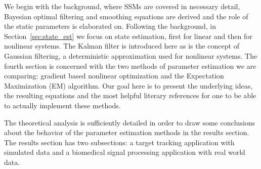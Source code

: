 
We begin with the background, where
SSMs are covered in necessary detail, Bayesian optimal filtering
and smoothing equations are derived and the role of the static parameters is elaborated
on. Following the background, in Section~\ref{sec:state_est} we focus on state estimation, first for linear
and then for nonlinear systems. The Kalman filter is introduced here as is the
concept of Gaussian filtering, a deterministic approximation used for nonlinear systems.
The fourth section is concerned with the two methods
of parameter estimation we are comparing: gradient based nonlinear optimization
and the Expectation Maximization (EM) algorithm. Our goal here is to present the underlying ideas,
the resulting equations and the most helpful literary references for one to be able to 
actually implement these methods.
 
The theoretical analysis is sufficiently detailed in order to 
draw some conclusions about the behavior of the
parameter estimation methods in the results section. The results section has two subsections: 
a target tracking application with simulated data and a biomedical signal processing 
application with real world data.



